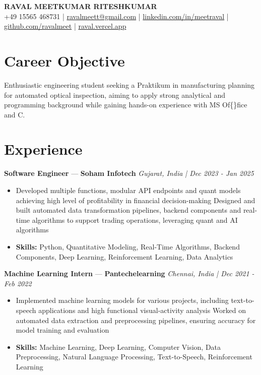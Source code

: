 \documentclass[a4paper,10pt]{article}
\begin{document}
\begin{center}
  {\Large\bfseries RAVAL MEETKUMAR RITESHKUMAR}\\[2pt]
  {\small +49 15565 468731 \;|\; \href{mailto:ravalmeett@gmail.com}{ravalmeett@gmail.com} \;|\; \href{https://www.linkedin.com/in/meetraval/}{linkedin.com/in/meetraval} \;|\; \href{https://github.com/ravalmeet}{github.com/ravalmeet} \;|\; \href{https://raval.vercel.app/}{raval.vercel.app}}
\end{center}
\vspace{-3pt}

\section*{Career Objective}
Enthusiastic engineering student seeking a Praktikum in manufacturing planning for automated optical inspection, aiming to apply strong analytical and programming background while gaining hands-on experience with MS Of\{\}fice and C.\par

\section*{Experience}
\textbf{Software Engineer} — \textbf{Soham Infotech} \hfill \textit{Gujarat, India \;|\; Dec 2023 - Jan 2025}\par
\vspace{1pt}
\begin{itemize}
  \item Developed multiple functions, modular API endpoints and quant models achieving high level of profitability in financial decision-making Designed and built automated data transformation pipelines, backend components and real-time algorithms to support trading operations, leveraging quant and AI algorithms
  \item \textbf{Skills:} Python, Quantitative Modeling, Real-Time Algorithms, Backend Components, Deep Learning, Reinforcement Learning, Data Analytics
\end{itemize}
\vspace{3pt}
\textbf{Machine Learning Intern} — \textbf{Pantechelearning} \hfill \textit{Chennai, India \;|\; Dec 2021 - Feb 2022}\par
\vspace{1pt}
\begin{itemize}
  \item Implemented machine learning models for various projects, including text-to-speech applications and high functional visual-activity analysis Worked on automated data extraction and preprocessing pipelines, ensuring accuracy for model training and evaluation
  \item \textbf{Skills:} Machine Learning, Deep Learning, Computer Vision, Data Preprocessing, Natural Language Processing, Text-to-Speech, Reinforcement Learning
\end{itemize}
\end{document}
